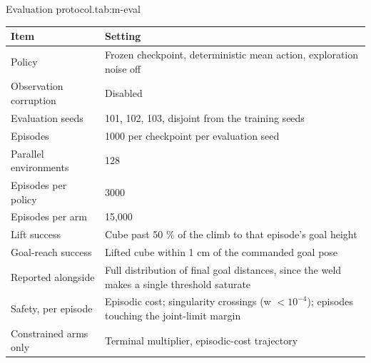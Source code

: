 \begin{kuettable}[H]{Evaluation protocol.}{tab:m-eval}
\begin{tabular*}{\textwidth}{@{\extracolsep{\fill}}p{}p{}}
\toprule
Item & Setting\\
\midrule
Policy & Frozen checkpoint, deterministic mean action, exploration noise off\\
Observation corruption & Disabled\\
Evaluation seeds & 101, 102, 103, disjoint from the training seeds\\
Episodes & 1000 per checkpoint per evaluation seed\\
Parallel environments & 128\\
Episodes per policy & 3000\\
Episodes per arm & 15{,}000\\
Lift success & Cube past 50 \% of the climb to that episode's goal height\\
Goal-reach success & Lifted cube within 1 cm of the commanded goal pose\\
Reported alongside & Full distribution of final goal distances, since the weld makes a single threshold saturate\\
Safety, per episode & Episodic cost; singularity crossings (w \(< 10^{-4}\)); episodes touching the joint-limit margin\\
Constrained arms only & Terminal multiplier, episodic-cost trajectory\\
\bottomrule
\end{tabular*}
\end{kuettable}
